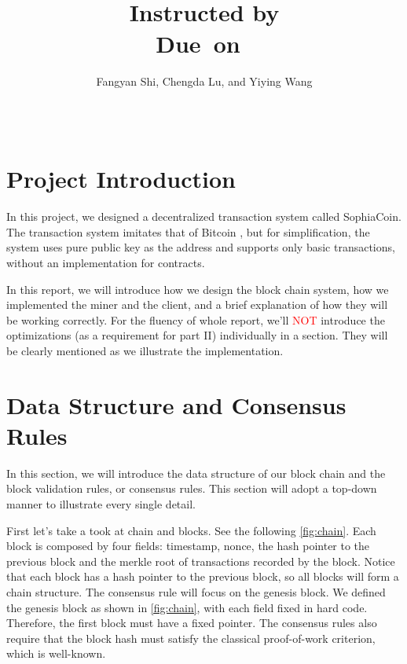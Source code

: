 \documentclass{article}
\title{\textmd{\bf \Title}\\{\large Instructed by \textit{\ClassInstructor}}\\\normalsize\vspace{0.1in}\small{Due\ on\ \DueDate}}
\date{}
\author{%
Fangyan Shi\affmark[1], Chengda Lu\affmark[2], and Yiying Wang\affmark[3]\\
\affaddr{\affmark[1]2021010892 \affmark[2]2021010899 \affmark[3]2020011604}\\
\email{\{\affmark[1]sfy21,\affmark[2]lucd21,\affmark[3]wangyiyi20\}@mails.tsinghua.edu.cn}\\
}
\begin{document}
\begin{spacing}{1.1}
\maketitle \thispagestyle{empty}

\newcommand{\bb}[1]{\mathbf{#1}}
\newcommand{\FIGDIR}{/home/osgroup4/Documents/os-project/temp/fig} %

\section{Project Introduction}
In this project, we designed a decentralized transaction system called SophiaCoin. The transaction system imitates that of Bitcoin \cite{bitcoin}, but for simplification, the system uses pure public key as the address and supports only basic transactions, without an implementation for contracts. 

In this report, we will introduce how we design the block chain system, how we implemented the miner and the client, and a brief explanation of how they will be working correctly. For the fluency of whole report, we'll \textcolor{red}{NOT} introduce the optimizations (as a requirement for part II) individually in a section. They will be clearly mentioned as we illustrate the implementation.

\section{Data Structure and Consensus Rules}

In this section, we will introduce the data structure of our block chain and the block validation rules, or consensus rules. This section will adopt a top-down manner to illustrate every single detail.

First let's take a took at chain and blocks. See the following \cref{fig:chain}. Each block is composed by four fields: timestamp, nonce, the hash pointer to the previous block and the merkle root of transactions recorded by the block. Notice that each block has a hash pointer to the previous block, so all blocks will form a chain structure. The consensus rule will focus on the genesis block. We defined the genesis block as shown in \cref{fig:chain}, with each field fixed in hard code. Therefore, the first block must have a fixed pointer. The consensus rules also require that the block hash must satisfy the classical proof-of-work criterion, which is well-known.


\end{spacing}
\end{document}
